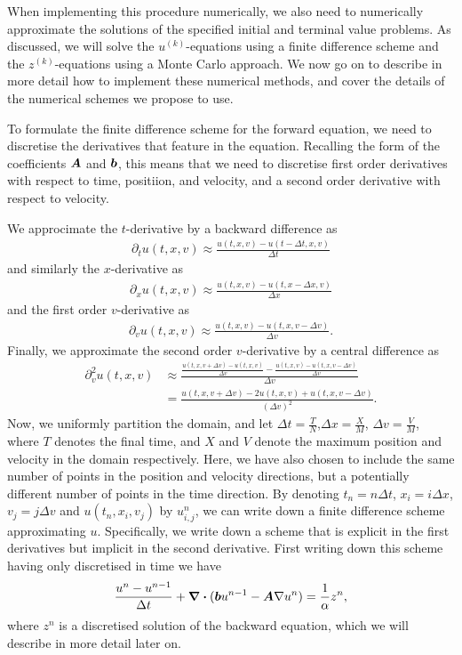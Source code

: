 When implementing this procedure numerically, we also need to numerically approximate the solutions of the specified initial and terminal value problems. As discussed, we will solve the $u^{(k)}$-equations using a finite difference scheme and the $z^{(k)}$-equations using a Monte Carlo approach. We now go on to describe in more detail how to implement these numerical methods, and cover the details of the numerical schemes we propose to use.

To formulate the finite difference scheme for the forward equation, we need to discretise the derivatives that feature in the equation. Recalling the form of the coefficients $\boldsymbol{A}$ and $\boldsymbol{b}$, this means that we need to discretise first order derivatives with respect to time, positiion, and velocity, and a second order derivative with respect to velocity.

We approcimate the $t$-derivative by a backward difference as
%
\begin{align} 
    \partial_t u(t,x,v) \approx \frac{u(t,x,v) - u(t-\Delta t,x,v)}{\Delta t}
\end{align}
%
and similarly the $x$-derivative as
%
\begin{align} 
    \partial_x u(t,x,v) \approx \frac{u(t,x,v) - u(t,x-\Delta x,v)}{\Delta x}
\end{align}
%
and the first order $v$-derivative as
%
\begin{align} 
    \partial_v u(t,x,v) \approx \frac{u(t,x,v) - u(t,x,v-\Delta v)}{\Delta v}.
\end{align}
%
Finally, we approximate the second order $v$-derivative by a central difference as
%
\begin{align} 
    \partial^2_v u(t,x,v) &\approx \frac{\frac{u(t,x,v+\Delta v)-u(t,x,v)}{\Delta v}-\frac{u(t,x,v)-u(t,x,v-\Delta v)}{\Delta v}}{\Delta v}\\
    &= \frac{u(t,x,v+\Delta v)- 2 u(t,x,v) + u(t,x,v-\Delta v)}{{(\Delta v)}^2}.
\end{align}
%
Now, we uniformly partition the domain, and let $\Delta t = \frac{T}{N}$,$\Delta x = \frac{X}{M}$, $\Delta v = \frac{V}{M}$, where $T$ denotes the final time, and $X$ and $V$ denote the maximum position and velocity in the domain respectively. Here, we have also chosen to include the same number of points in the position and velocity directions, but a potentially different number of points in the time direction. By denoting  $t_n=n\Delta t$, $x_i=i\Delta x$,$v_j=j\Delta v$ and $u(t_n,x_i,v_j)$ by $u^n_{i,j}$, we can write down a finite difference scheme approximating $u$. Specifically, we write down a scheme that is explicit in the first derivatives but implicit in the second derivative. First writing down this scheme having only discretised in time we have
%
\begin{align} %
    \frac{u^n-u^{n-1}}{\Delta t} + \div{(\vecbf{b}u^{n-1} - \vecbf{A} \nabla u^n)} = \frac{1}{\alpha} z^n,
\end{align}
%
where $z^n$ is a discretised solution of the backward equation, which we will describe in more detail later on.

